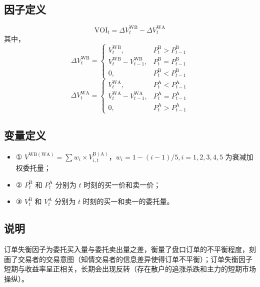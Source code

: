 \documentclass{article}
\begin{document}
\subsection{因子定义}
\begin{equation}
    \mathrm{VOI}_t = \Delta V_t^{\mathrm{WB}} - \Delta V_t^{\mathrm{WA}}
\end{equation}
其中，
\begin{equation}
    \Delta V_t^{\mathrm{WB}} = 
    \begin{cases}
        V_t^{\mathrm{WB}} , & P_t^{\mathrm{B}} > P_{t-1}^{\mathrm{B}} \\
        V_t^{\mathrm{WB}} - V_{t-1}^{\mathrm{WB}}, & P_t^{\mathrm{B}} = P_{t-1}^{\mathrm{B}} \\
        0, & P_t^{\mathrm{B}} < P_{t-1}^{\mathrm{B}}
    \end{cases}
\end{equation}
\begin{equation}
    \Delta V_t^{\mathrm{WA}} = 
    \begin{cases}
        V_t^{\mathrm{WA}}, & P_t^{\mathrm{A}} < P_{t-1}^{\mathrm{A}} \\
        V_t^{\mathrm{WA}} - V_{t-1}^{\mathrm{WA}}, & P_t^{\mathrm{A}} = P_{t-1}^{\mathrm{A}} \\
        0, & P_t^{\mathrm{A}} > P_{t-1}^{\mathrm{A}}
    \end{cases}
\end{equation}

\subsection{变量定义}
\begin{itemize}
    \item ① \( V^{\mathrm{WB}(\mathrm{WA})} = \sum w_i \times V_{i,t}^{\mathrm{B}(\mathrm{A})} \)，\( w_i = 1 - (i-1)/5, i=1,2,3,4,5 \) 为衰减加权委托量；
    \item ② \( P_t^{\mathrm{B}} \) 和 \( P_t^{\mathrm{A}} \) 分别为 \( t \) 时刻的买一价和卖一价；
    \item ③ \( V_t^{\mathrm{B}} \) 和 \( V_t^{\mathrm{A}} \) 分别为 \( t \) 时刻的买一和卖一的委托量。
\end{itemize}

\subsection{说明}
订单失衡因子为委托买入量与委托卖出量之差，衡量了盘口订单的不平衡程度，刻画了交易者的交易意图（知情交易者的信息差异使得订单不平衡）；订单失衡因子短期与收益率呈正相关，长期会出现反转（存在散户的追涨杀跌和主力的短期市场操纵）。
\end{document}
